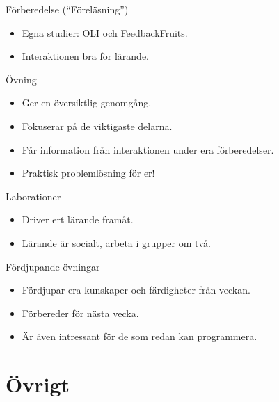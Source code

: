 \begin{frame}
  \begin{block}{Förberedelse (\enquote{Föreläsning})}
    \begin{itemize}
      \item Egna studier: OLI och FeedbackFruits.
      \item Interaktionen bra för lärande.
    \end{itemize}
  \end{block}

  \pause
  
  \begin{block}{Övning}
    \begin{itemize}
      \item Ger en översiktlig genomgång.
      \item Fokuserar på de viktigaste delarna.
      \item Får information från interaktionen under era förberedelser.
      \item Praktisk problemlösning för er!
    \end{itemize}
  \end{block}
\end{frame}

\begin{frame}
  \begin{block}{Laborationer}
    \begin{itemize}
      \item Driver ert lärande framåt.
      \item Lärande är socialt, arbeta i grupper om två.
    \end{itemize}
  \end{block}
\end{frame}

\begin{frame}[fragile]
  \begin{block}{Fördjupande övningar}
    \begin{itemize}
      \item Fördjupar era kunskaper och färdigheter från veckan.
      \item Förbereder för nästa vecka.
      \item Är även intressant för de som redan kan programmera.
    \end{itemize}
  \end{block}
\end{frame}

\section{Övrigt}

